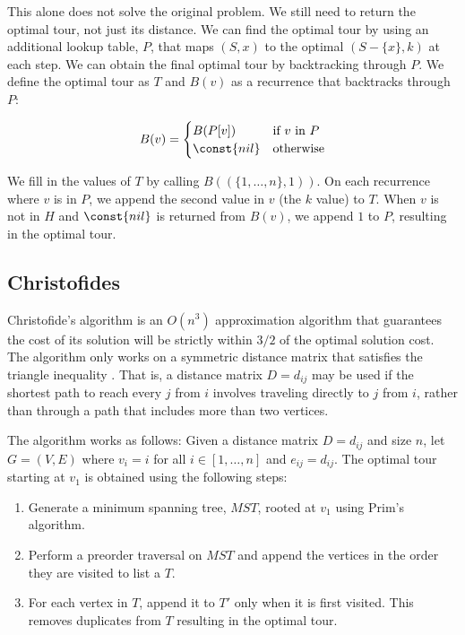 \documentclass[11pt,fleqn]{article}
\begin{document}
This alone does not solve the original problem.  We still need to return 
the optimal tour, not just its distance.  We can find the optimal tour
by using an additional lookup table, $P$, that maps $(S, x)$ to the optimal
$(S-\{x\}, k)$ at each step.  We can obtain the final optimal tour by
backtracking through $P$.  We define the optimal tour as $T$ and $B(v)$ as a
recurrence that backtracks through $P$:

\begin{align*}
  B(v)=\begin{cases}
    B(P[v])     & \text{if } v \text{\ in\ } P \\
    \const{nil} & \text{otherwise} 
  \end{cases}
\end{align*}

We fill in the values of $T$ by calling $B((\{1,\dots,n\}, 1))$.  On each
recurrence where $v$ is in $P$, we append the second value in $v$ (the $k$
value) to $T$.  When $v$ is not in $H$ and $\const{nil}$ is returned
from $B(v)$, we append $1$ to $P$, resulting in the optimal tour.
\par

\subsection{Christofides}
Christofide's algorithm is an $O(n^3)$ approximation algorithm that guarantees
the cost of its solution will be strictly within $3/2$ of the optimal solution
cost.  The algorithm only works on a symmetric distance matrix that satisfies
the triangle inequality \cite{nicos}.  That is, a distance matrix $D=d_{ij}$
may be used if the shortest path to reach every $j$ from
$i$ involves traveling directly to $j$ from $i$, rather than through a path that
includes more than two vertices.
\par

The algorithm works as follows: Given a distance matrix $D=d_{ij}$ and size $n$,
let $G=(V,E)$ where $v_i=i$ for all $i\in [1,\dots,n]$ and $e_{ij}=d_{ij}$.  The
optimal tour starting at $v_1$ is obtained using the following steps:
\begin{enumerate}
  \item Generate a minimum spanning tree, $MST$, rooted at $v_1$ using Prim's algorithm.
  \item Perform a preorder traversal on $MST$ and append the vertices in the order they 
    are visited to list a $T$.
  \item For each vertex in $T$, append it to $T'$ only when it is first visited.  This 
    removes duplicates from $T$ resulting in the optimal tour.
\end{enumerate}
\end{document}
